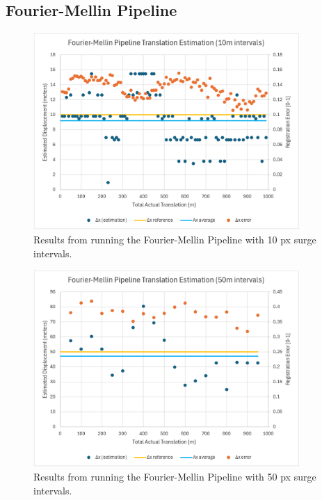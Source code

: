 \subsection{Fourier-Mellin Pipeline}

\begin{figure}[H]
  \centering
  \includegraphics[width=0.9\textwidth]{figures/results/Thesis-Surge/FMT-0.png}
  \caption{Results from running the Fourier-Mellin Pipeline with 10 px surge intervals.}
\end{figure}

\begin{figure}[H]
  \centering
  \includegraphics[width=0.9\textwidth]{figures/results/Thesis-Surge/FMT-4.png}
  \caption{Results from running the Fourier-Mellin Pipeline with 50 px surge intervals.}
\end{figure}

